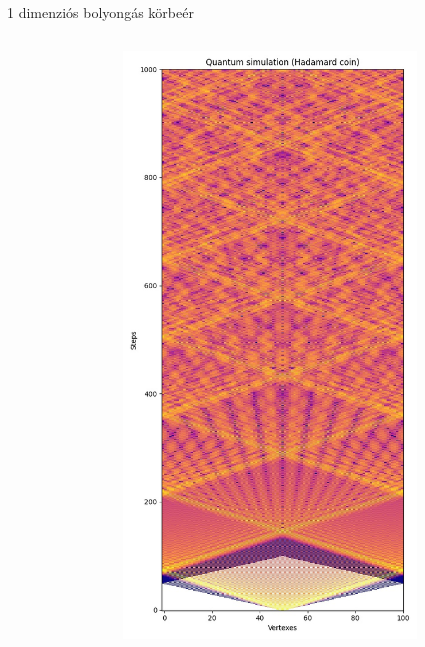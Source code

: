 \documentclass[aspectratio=169]{beamer}
\begin{document}
\begin{frame}{1 dimenziós bolyongás körbeér}
\begin{columns}[onlytextwidth]
\begin{column}{.25\textwidth}
\begin{figure}
      \end{figure}
    \end{column}
    \begin{column}{.25\textwidth}
      \begin{figure}
        \includegraphics[width=0.9\textwidth]{./tdk_figures/results/path/hadamard.jpg}
      \end{figure}
    \end{column}
    \begin{column}{.25\textwidth}
    \end{column}
  \end{columns}
\end{frame}
\end{document}
